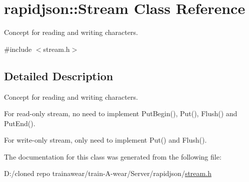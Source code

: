 \hypertarget{classrapidjson_1_1_stream}{}\section{rapidjson\+::Stream Class Reference}
\label{classrapidjson_1_1_stream}


Concept for reading and writing characters.  




{\ttfamily \#include $<$stream.\+h$>$}



\subsection{Detailed Description}
Concept for reading and writing characters. 

For read-\/only stream, no need to implement Put\+Begin(), Put(), Flush() and Put\+End().

For write-\/only stream, only need to implement Put() and Flush().


\begin{DoxyCode}{0}
\DoxyCodeLine{}
\DoxyCodeLine{}
\DoxyCodeLine{}
\DoxyCodeLine{}
\DoxyCodeLine{}
\DoxyCodeLine{}
\DoxyCodeLine{}
\DoxyCodeLine{\}}
\end{DoxyCode}
 

The documentation for this class was generated from the following file\+:\begin{DoxyCompactItemize}
\item 
D\+:/cloned repo trainawear/train-\/\+A-\/wear/\+Server/rapidjson/\mbox{\hyperlink{stream_8h}{stream.\+h}}\end{DoxyCompactItemize}
